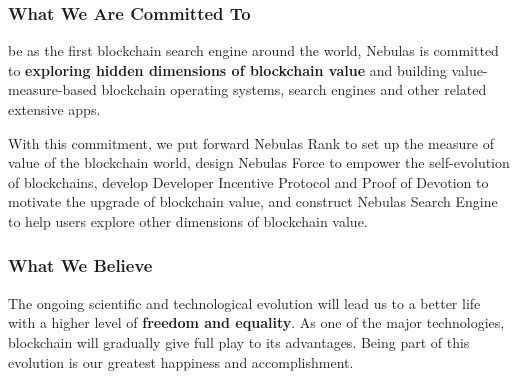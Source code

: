
\subsubsection*{What We Are Committed To}

be as the first blockchain search engine around the world, Nebulas is committed to \textbf{exploring hidden dimensions of blockchain value} and building value-measure-based blockchain operating systems, search engines and other related extensive apps.


With this commitment, we put forward Nebulas Rank to set up the measure of value of the blockchain world, design Nebulas Force to empower the self-evolution of blockchains, develop Developer Incentive Protocol and Proof of Devotion to motivate the upgrade of blockchain value, and construct Nebulas Search Engine to help users explore other dimensions of blockchain value.


\subsubsection*{What We Believe}

The ongoing scientific and technological evolution will lead us to a better life with a higher level of \textbf{freedom and equality}. As one of the major technologies, blockchain will gradually give full play to its advantages. Being part of this evolution is our greatest happiness and accomplishment.


